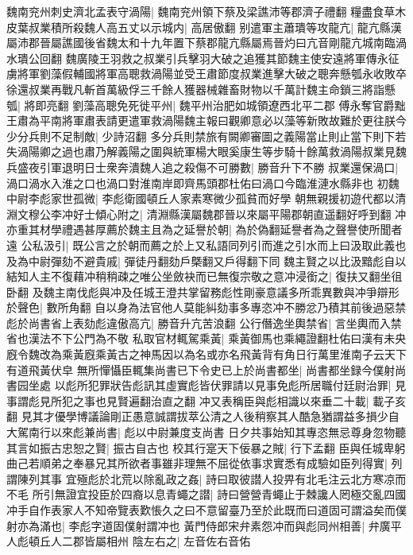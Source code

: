 魏南兖州刺史濟北孟表守渦陽|{
	魏南兖州領下蔡及梁譙沛等郡濟子禮翻}
糧盡食草木皮葉叔業積所殺魏人高五丈以示城内|{
	高居傲翻}
别遣軍主蕭璝等攻龍亢|{
	龍亢縣漢屬沛郡晉屬譙國後省魏太和十九年置下蔡郡龍亢縣屬焉晉灼曰亢音剛龍亢城南臨渦水璝公回翻}
魏廣陵王羽救之叔業引兵擊羽大破之追獲其節魏主使安遠將軍傳永征虜將軍劉藻假輔國將軍高聰救渦陽並受王肅節度叔業進擊大破之聰奔懸瓠永收敗卒徐還叔業再戰凡斬首萬級俘三千餘人獲器械雜畜財物以千萬計魏主命鎖三將詣懸瓠|{
	將即亮翻}
劉藻高聰免死徙平州|{
	魏平州治肥如城領遼西北平二郡}
傅永奪官爵黜王肅為平南將軍肅表請更遣軍救渦陽魏主報曰觀卿意必以藻等新敗故難於更往朕今少分兵則不足制敵|{
	少詩沼翻}
多分兵則禁旅有闕卿審圖之義陽當止則止當下則下若失渦陽卿之過也肅乃解義陽之圍與統軍楊大眼奚康生等步騎十餘萬救渦陽叔業見魏兵盛夜引軍退明日士衆奔潰魏人追之殺傷不可勝數|{
	勝音升下不勝}
叔業還保渦口|{
	渦口渦水入淮之口也渦口對淮南岸即齊馬頭郡杜佑曰渦口今臨淮漣水縣非也}
初魏中尉李彪家世孤微|{
	李彪衛國頓丘人家素寒微少孤貧而好學}
朝無親援初遊代都以清淵文穆公李冲好士傾心附之|{
	清淵縣漢屬魏郡晉以來屬平陽郡朝直遥翻好呼到翻}
冲亦重其材學禮遇甚厚薦於魏主且為之延譽於朝|{
	為於偽翻延譽者為之聲譽使所聞者遠}
公私汲引|{
	既公言之於朝而薦之於上又私語同列引而進之引水而上曰汲取此義也}
及為中尉彈劾不避貴戚|{
	彈徒丹翻劾戶槩翻又戶得翻下同}
魏主賢之以比汲黯彪自以結知人主不復藉冲稍稍疎之唯公坐斂袂而已無復宗敬之意冲浸銜之|{
	復扶又翻坐徂卧翻}
及魏主南伐彪與冲及任城王澄共掌留務彪性剛豪意議多所乖異數與冲爭辯形於聲色|{
	數所角翻}
自以身為法官他人莫能糾劾事多專恣冲不勝忿乃積其前後過惡禁彪於尚書省上表劾彪違傲高亢|{
	勝音升亢苦浪翻}
公行僭逸坐輿禁省|{
	言坐輿而入禁省也漢法不下公門為不敬}
私取官材輒駕乘黃|{
	乘黃御馬也乘繩證翻杜佑曰漢有未央廐令魏改為乘黃廐乘黃古之神馬因以為名或亦名飛黃背有角日行萬里淮南子云天下有道飛黃伏皁}
無所憚懾臣輒集尚書已下令史已上於尚書都坐|{
	尚書都坐録今僕射尚書园坐處}
以彪所犯罪狀告彪訊其虛實彪皆伏罪請以見事免彪所居職付廷尉治罪|{
	見事謂彪見所犯之事也見賢遍翻治直之翻}
冲又表稱臣與彪相識以來垂二十載|{
	載子亥翻}
見其才優學博議論剛正愚意誠謂拔萃公清之人後稍察其人酷急猶謂益多損少自大駕南行以來彪兼尚書|{
	彪以中尉兼度支尚書}
日夕共事始知其專恣無忌尊身忽物聽其言如振古忠恕之賢|{
	振古自古也}
校其行寔天下佞暴之賊|{
	行下孟翻}
臣與任城卑躬曲己若順弟之奉暴兄其所欲者事雖非理無不屈從依事求實悉有成驗如臣列得實|{
	列謂陳列其事}
宜殛彪於北荒以除亂政之姦|{
	詩曰取彼譛人投畀有北毛注云北方寒凉而不毛}
所引無證宜投臣於四裔以息青蠅之譛|{
	詩曰營營青蠅止于棘讒人罔極交亂四國}
冲手自作表家人不知帝覽表歎悵久之曰不意留臺乃至於此既而曰道固可謂溢矣而僕射亦為滿也|{
	李彪字道固僕射謂冲也}
黃門侍郎宋弁素怨冲而與彪同州相善|{
	弁廣平人彪頓丘人二郡皆屬相州}
陰左右之|{
	左音佐右音佑}
